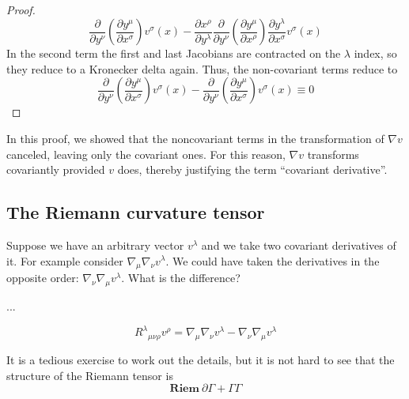 \begin{proof}
$$
\frac {∂}{∂y^ν} \left(\frac {∂y^μ}{∂x^σ} \right)v^σ(x) 
	-  \frac {∂x^ρ}{∂y^λ} \frac {∂}{∂y^ν}\left(\frac {∂y^μ}{∂x^ρ}\right)
	\frac {∂y^λ}{∂x^σ}v^σ(x) 
$$
In the second term the first and last Jacobians are contracted on the $λ$ index, so they reduce to a Kronecker delta again. Thus, the non-covariant terms reduce to 
$$
\frac {∂}{∂y^ν} \left(\frac {∂y^μ}{∂x^σ} \right)v^σ(x) 
	- \frac {∂}{∂y^ν}\left( \frac {∂y^μ}{∂x^σ}\right)v^σ(x) ≡ 0
$$
\end{proof}
In this proof, we showed that the noncovariant terms in the transformation of $∇v$ canceled, leaving only the covariant ones. For this reason, $∇v$ transforms covariantly provided $v$ does, thereby justifying the term “covariant derivative”.

\subsection{The Riemann curvature tensor}

Suppose we have an arbitrary vector $v^λ$ and we take two covariant derivatives of it. For example consider $∇_μ ∇_ν v^λ$. We could have taken the derivatives in the opposite order: $∇_ν ∇_μ v^λ$. What is the difference?

...

$$
R^λ{}_{μνρ} v^ρ = ∇_μ ∇_ν v^λ - ∇_ν ∇_μ v^λ
$$

It is a tedious exercise to work out the details, but it is not hard to see that the structure of the Riemann tensor is 
$$
{\mathbf{Riem}}~ ∂Γ + Γ Γ 
$$











  